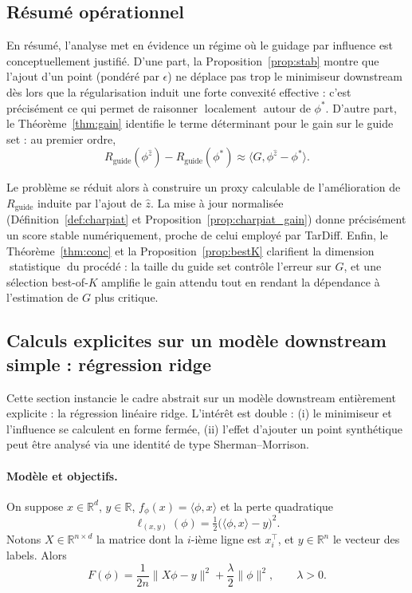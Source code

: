 \documentclass[11pt]{article}
\begin{document}
\subsection{Résumé opérationnel}

En résumé, l'analyse met en évidence un régime où le guidage par influence est conceptuellement justifié. D'une part, la Proposition~\ref{prop:stab} montre que l'ajout d'un point (pondéré par $\epsilon$) ne déplace pas trop le minimiseur downstream dès lors que la régularisation induit une forte convexité effective : c'est précisément ce qui permet de raisonner localement autour de $\phi^*$. D'autre part, le Théorème~\ref{thm:gain} identifie le terme déterminant pour le gain sur le guide set : au premier ordre,
\[
R_{\text{guide}}(\phi^{\hat z})-R_{\text{guide}}(\phi^*) \approx \langle G,\phi^{\hat z}-\phi^*\rangle.
\]

Le problème se réduit alors à construire un proxy calculable de l'amélioration de $R_{\text{guide}}$ induite par l'ajout de $\hat z$. La mise à jour normalisée (Définition~\ref{def:charpiat} et Proposition~\ref{prop:charpiat_gain}) donne précisément un score stable numériquement, proche de celui employé par TarDiff.
Enfin, le Théorème~\ref{thm:conc} et la Proposition~\ref{prop:bestK} clarifient la dimension statistique du procédé : la taille du guide set contrôle l'erreur sur $G$, et une sélection best-of-$K$ amplifie le gain attendu tout en rendant la dépendance à l'estimation de $G$ plus critique.

\subsection{Calculs explicites sur un modèle downstream simple : régression ridge}
\label{subsec:ridge}
Cette section instancie le cadre abstrait sur un modèle downstream entièrement explicite : la régression linéaire ridge. L'intérêt est double : (i) le minimiseur et l'influence se calculent en forme fermée, (ii) l'effet d'ajouter un point synthétique peut être analysé via une identité de type Sherman--Morrison.

\paragraph{Modèle et objectifs.}
On suppose $x\in\mathbb R^d$, $y\in\mathbb R$, $f_\phi(x)=\langle \phi,x\rangle$ et la perte quadratique
\[
\ell_{(x,y)}(\phi)=\tfrac12\big(\langle \phi,x\rangle-y\big)^2.
\]
Notons $X\in\mathbb R^{n\times d}$ la matrice dont la $i$-ième ligne est $x_i^\top$, et $y\in\mathbb R^n$ le vecteur des labels. Alors
\[
F(\phi)=\frac{1}{2n}\|X\phi-y\|^2+\frac{\lambda}{2}\|\phi\|^2,
\qquad \lambda>0.
\]
\end{document}
